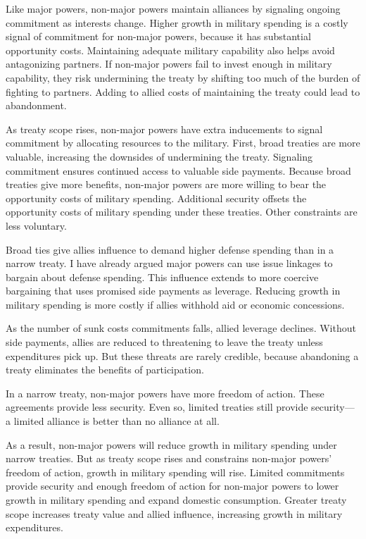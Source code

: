 \documentclass[12pt]{article}
\begin{document}
Like major powers, non-major powers maintain alliances by signaling ongoing commitment as interests change. 
Higher growth in military spending is a costly signal of commitment for non-major powers, because it has substantial opportunity costs. 
Maintaining adequate military capability also helps avoid antagonizing partners. 
If non-major powers fail to invest enough in military capability, they risk undermining the treaty by shifting too much of the burden of fighting to partners. 
Adding to allied costs of maintaining the treaty could lead to abandonment. 


As treaty scope rises, non-major powers have extra inducements to signal commitment by allocating resources to the military.
First, broad treaties are more valuable, increasing the downsides of undermining the treaty. 
Signaling commitment ensures continued access to valuable side payments.   
Because broad treaties give more benefits, non-major powers are more willing to bear the opportunity costs of military spending. 
Additional security offsets the opportunity costs of military spending under these treaties.
Other constraints are less voluntary.   


Broad ties give allies influence to demand higher defense spending than in a narrow treaty. 
I have already argued major powers can use issue linkages to bargain about defense spending. 
This influence extends to more coercive bargaining that uses promised side payments as leverage. 
Reducing growth in military spending is more costly if allies withhold aid or economic concessions. 


As the number of sunk costs commitments falls, allied leverage declines. 
Without side payments, allies are reduced to threatening to leave the treaty unless expenditures pick up. 
But these threats are rarely credible, because abandoning a treaty eliminates the benefits of participation. 


In a narrow treaty, non-major powers have more freedom of action.  
These agreements provide less security.  
Even so, limited treaties still provide security--- a limited alliance is better than no alliance at all. 


As a result, non-major powers will reduce growth in military spending under narrow treaties. 
But as treaty scope rises and constrains non-major powers' freedom of action, growth in military spending will rise. 
Limited commitments provide security and enough freedom of action for non-major powers to lower growth in military spending and expand domestic consumption. 
Greater treaty scope increases treaty value and allied influence, increasing growth in military expenditures. 
\end{document}
